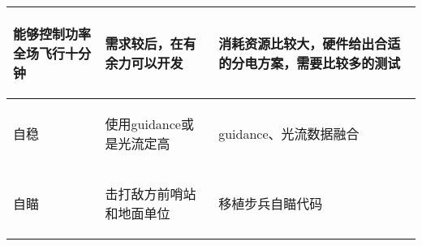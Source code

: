 \begin{longtable}{ p{2cm} | p{7.8cm} | p{6cm} |}
    \hline
    
        \begin{center}
            能够控制功率全场飞行十分钟 
        \end{center} \cellcolor{gndcolor} &
        \begin{center}
            需求较后，在有余力可以开发
        \end{center} \cellcolor{gndcolor} &
        \begin{center}
            消耗资源比较大，硬件给出合适的分电方案，需要比较多的测试
        \end{center} \cellcolor{gndcolor} \\

    \hline
    
        \begin{center}
            自稳
        \end{center} &
        \begin{center}
            使用guidance或是光流定高
        \end{center} &
        \begin{center}
            guidance、光流数据融合
        \end{center} \\
        
    \hline
    
        \begin{center}
            自瞄
        \end{center} &
        \begin{center}
            击打敌方前哨站和地面单位
        \end{center} &
        \begin{center}
            移植步兵自瞄代码
        \end{center} \\
        
    \hline
    
\end{longtable}
